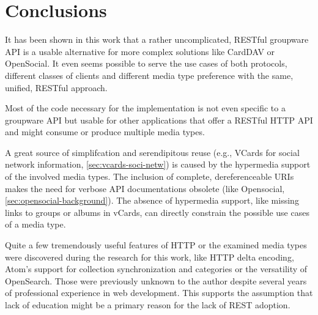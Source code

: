 \documentclass[11pt,a4paper,headsepline,twoside]{scrartcl}		%
\begin{document}
\section{Conclusions}
\label{sec:conclusions}




It has been shown in this work that a rather uncomplicated, RESTful groupware
API is a usable alternative for more complex solutions like CardDAV or
OpenSocial. It even seems possible to serve the use cases of both protocols,
different classes of clients and different media type preference with the same,
unified, RESTful approach.

Most of the code necessary for the implementation is not even specific to a
groupware API but usable for other applications that offer a RESTful HTTP API
and might consume or produce multiple media types.

A great source of simplifcation and serendipitous reuse (e.g., VCards for social
network information, \autoref{sec:vcards-soci-netw}) is caused by the hypermedia
support of the involved media types.  The inclusion of complete, dereferenceable
URIs makes the need for verbose API documentations obsolete (like Opensocial,
\autoref{sec:opensocial-background}). The absence of hypermedia support, like
missing links to groups or albums in vCards, can directly constrain the possible
use cases of a media type.

Quite a few tremendously useful features of HTTP or the examined media types were
discovered during the research for this work, like HTTP delta encoding, Atom's
support for collection synchronization and categories or the versatility of
OpenSearch. Those were previously unknown to the author despite several years of
professional experience in web development. This supports the assumption that
lack of education might be a primary reason for the lack of REST adoption.
\end{document}
